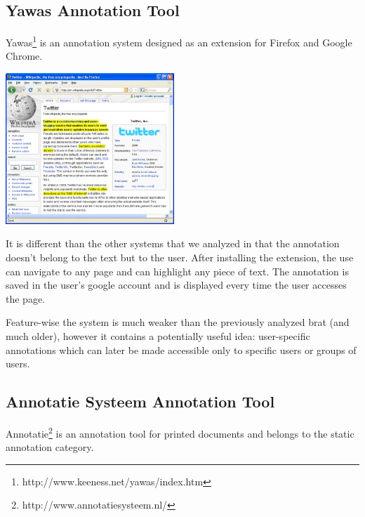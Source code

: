 \documentclass[a4paper, 12pt, notitlepage]{report}
\begin{document}
\subsection{Yawas Annotation Tool} %
Yawas\footnote{http://www.keeness.net/yawas/index.htm} is an annotation system designed as an extension for Firefox and Google Chrome.\\[0.1in]
\begin{center}
\includegraphics[width=2.5in]{yawas.jpg}
\end{center}
It is different than the other systems that we analyzed in that the annotation doesn't belong to the text but to the user. After installing the extension, the use can navigate to any page
and can highlight any piece of text. The annotation is saved in the user's google account and is displayed every time the user accesses the page.\vspace{10pt}

Feature-wise the system is much weaker than the previously analyzed brat (and much older), however it contains a potentially useful idea: user-specific annotations which can later be made accessible only to
specific users or groups of users.



\subsection{Annotatie Systeem Annotation Tool} %
Annotatie\footnote{http://www.annotatiesysteem.nl/} is an annotation tool for printed documents and belongs to the static annotation category.\vspace{10pt}
\end{document}
